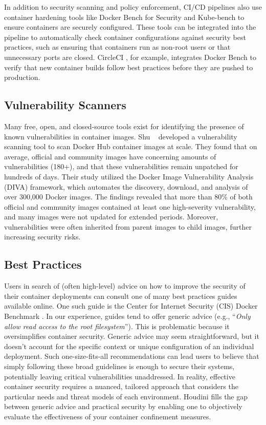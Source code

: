 \documentclass[12pt]{report}
\begin{document}
\begin{doublespace}
In addition to security scanning and policy enforcement, CI/CD pipelines also use container hardening tools like Docker Bench for Security \cite{docker_bench} and Kube-bench \cite{kube_bench} to ensure containers are securely configured. These tools can be integrated into the pipeline to automatically check container configurations against security best practices, such as ensuring that containers run as non-root users or that unnecessary ports are closed. CircleCI \cite{circleci}, for example, integrates Docker Bench to verify that new container builds follow best practices before they are pushed to production.\\

\subsection{Vulnerability Scanners} 

Many free, open, and closed-source tools exist for identifying the presence of known vulnerabilities in container images. Shu \etal~\cite{shu2017study} developed a vulnerability scanning tool to scan Docker Hub container images at scale. They found that on average, official and community images have concerning amounts of vulnerabilities (180+), and that these vulnerabilities remain unpatched for hundreds of days. Their study utilized the Docker Image Vulnerability Analysis (DIVA) framework, which automates the discovery, download, and analysis of over 300,000 Docker images. The findings revealed that more than 80\% of both official and community images contained at least one high-severity vulnerability, and many images were not updated for extended periods. Moreover, vulnerabilities were often inherited from parent images to child images, further increasing security risks.\\

\subsection{Best Practices} 

Users in search of (often high-level) advice on how to improve the security of their container deployments can consult one of many best practices guides available online. One such guide is the Center for Internet Security (CIS) Docker Benchmark \cite{CIS}. In our experience, guides tend to offer generic advice (e.g., ``\textit{Only allow read access to the root filesystem}''). This is problematic because it oversimplifies container security. Generic advice may seem straightforward, but it doesn't account for the specific context or unique configuration of an individual deployment. Such one-size-fits-all recommendations can lead users to believe that simply following these broad guidelines is enough to secure their systems, potentially leaving critical vulnerabilities unaddressed. In reality, effective container security requires a nuanced, tailored approach that considers the particular needs and threat models of each environment. Houdini fills the gap between generic advice and practical security by enabling one to objectively evaluate the effectiveness of your container confinement measures.\\


\end{doublespace}
\end{document}
